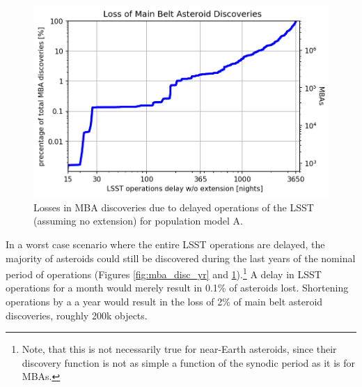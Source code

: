 \begin{figure}[tb!]
\begin{center}
\includegraphics[width=0.70\linewidth]{figs/lost4.png}
\end{center}
\caption{Losses in \gls{MBA} discoveries due to delayed operations of the \gls{LSST} (assuming no extension) for population model A.}
\label{fig:lost}       %
\end{figure}
In a worst case scenario where the entire \gls{LSST} operations are delayed, the majority of asteroids could still be discovered during the last years of the nominal period of operations (Figures \ref{fig:mba_disc_yr} and \ref{fig:lost}).\footnote{Note, that this is not necessarily true for near-Earth asteroids, since their discovery function is not as simple a function of the synodic period as it is for MBAs.}
A delay in \gls{LSST} operations for a month would merely result in 0.1\% of asteroids lost. Shortening operations by a
a year would result in the loss of 2\% of main belt asteroid discoveries, roughly 200k objects.

\clearpage

